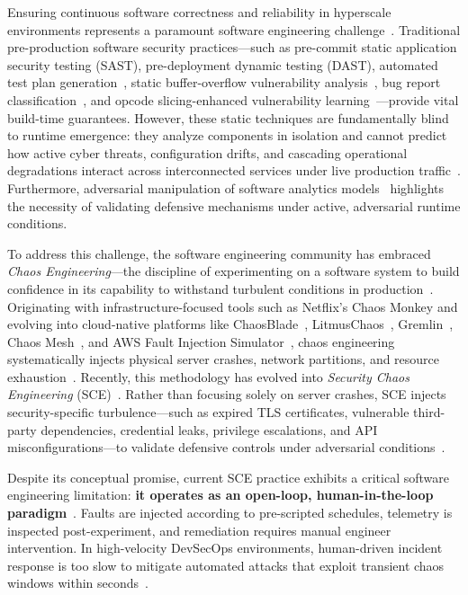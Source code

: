 \documentclass[11pt,a4paper]{article}
\begin{document}
Ensuring continuous software correctness and reliability in hyperscale environments represents a paramount software engineering challenge~\cite{brooker2025systems}. Traditional pre-production software security practices—such as pre-commit static application security testing (SAST), pre-deployment dynamic testing (DAST), automated test plan generation~\cite{haldar2026testplan}, static buffer-overflow vulnerability analysis~\cite{huang2026cotstatic}, bug report classification~\cite{du2024llmbrc}, and opcode slicing-enhanced vulnerability learning~\cite{tong2026osel}—provide vital build-time guarantees. However, these static techniques are fundamentally blind to runtime emergence: they analyze components in isolation and cannot predict how active cyber threats, configuration drifts, and cascading operational degradations interact across interconnected services under live production traffic~\cite{shortridge2023security, owotogbe2025chaos}. Furthermore, adversarial manipulation of software analytics models~\cite{awal2025adversarial} highlights the necessity of validating defensive mechanisms under active, adversarial runtime conditions.

To address this challenge, the software engineering community has embraced \textit{Chaos Engineering}—the discipline of experimenting on a software system to build confidence in its capability to withstand turbulent conditions in production~\cite{basiri2016chaos, rosenthal2020chaos}. Originating with infrastructure-focused tools such as Netflix's Chaos Monkey and evolving into cloud-native platforms like ChaosBlade~\cite{chaosblade2021}, LitmusChaos~\cite{litmus2022}, Gremlin~\cite{gremlin2022}, Chaos Mesh~\cite{chaosmesh2021}, and AWS Fault Injection Simulator~\cite{awsfis2023}, chaos engineering systematically injects physical server crashes, network partitions, and resource exhaustion~\cite{camacho2022chaos, esen2025chaos, baghorn2022fault}. Recently, this methodology has evolved into \textit{Security Chaos Engineering} (SCE)~\cite{shortridge2023security, myrbakken2021security}. Rather than focusing solely on server crashes, SCE injects security-specific turbulence—such as expired TLS certificates, vulnerable third-party dependencies, credential leaks, privilege escalations, and API misconfigurations—to validate defensive controls under adversarial conditions~\cite{myrbakken2021security, bedoya2024enhancing}.

Despite its conceptual promise, current SCE practice exhibits a critical software engineering limitation: \textbf{it operates as an open-loop, human-in-the-loop paradigm}~\cite{owotogbe2025chaos, shortridge2023security}. Faults are injected according to pre-scripted schedules, telemetry is inspected post-experiment, and remediation requires manual engineer intervention. In high-velocity DevSecOps environments, human-driven incident response is too slow to mitigate automated attacks that exploit transient chaos windows within seconds~\cite{shortridge2023security, liu2025autonomous}.
\end{document}
